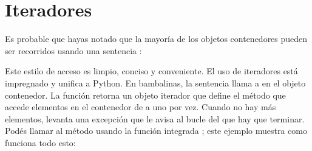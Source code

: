 \documentclass[a4,10pt,spanish]{sphinxmanual}
\begin{document}
\section{Iteradores}
\label{\detokenize{tutorial/classes:iterators}}\label{\detokenize{tutorial/classes:tut-iterators}}
\sphinxAtStartPar
Es probable que hayas notado que la mayoría de los objetos contenedores pueden ser recorridos usando una sentencia :

\begin{sphinxVerbatim}[commandchars=\\\{\}]
   \PYG{p}{[}  \PYG{p}{]}
     
    
   
   
     
\end{sphinxVerbatim}

\sphinxAtStartPar
Este estilo de acceso es limpio, conciso y conveniente.  El uso de iteradores está impregnado y unifica a Python.  En bambalinas, la sentencia  llama a  en el objeto contenedor.  La función retorna un objeto iterador que define el método  que accede elementos en el contenedor de a uno por vez.  Cuando no hay más elementos,  levanta una excepción  que le avisa al bucle del  que hay que terminar.  Podés llamar al método  usando la función integrada ; este ejemplo muestra como funciona todo esto:
\end{document}
